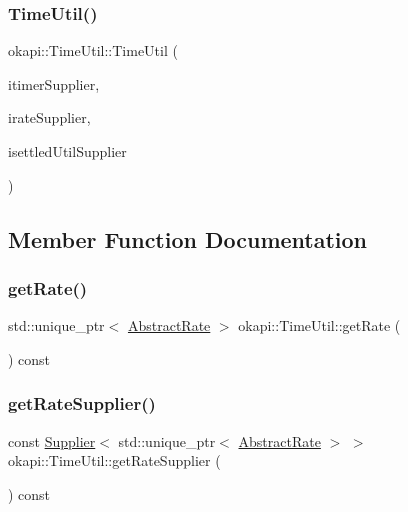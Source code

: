 \subsubsection{\texorpdfstring{TimeUtil()}{TimeUtil()}}
{\footnotesize\ttfamily okapi\+::\+Time\+Util\+::\+Time\+Util (\begin{DoxyParamCaption}\item[{const \mbox{\hyperlink{classokapi_1_1Supplier}{Supplier}}$<$ std\+::unique\+\_\+ptr$<$ \mbox{\hyperlink{classokapi_1_1AbstractTimer}{Abstract\+Timer}} $>$$>$ \&}]{itimer\+Supplier,  }\item[{const \mbox{\hyperlink{classokapi_1_1Supplier}{Supplier}}$<$ std\+::unique\+\_\+ptr$<$ \mbox{\hyperlink{classokapi_1_1AbstractRate}{Abstract\+Rate}} $>$$>$ \&}]{irate\+Supplier,  }\item[{const \mbox{\hyperlink{classokapi_1_1Supplier}{Supplier}}$<$ std\+::unique\+\_\+ptr$<$ \mbox{\hyperlink{classokapi_1_1SettledUtil}{Settled\+Util}} $>$$>$ \&}]{isettled\+Util\+Supplier }\end{DoxyParamCaption})}



\subsection{Member Function Documentation}
\mbox{\label{classokapi_1_1TimeUtil_a71a161d82855bcab94e128106c1646e9}} 
\subsubsection{\texorpdfstring{getRate()}{getRate()}}
{\footnotesize\ttfamily std\+::unique\+\_\+ptr$<$ \mbox{\hyperlink{classokapi_1_1AbstractRate}{Abstract\+Rate}} $>$ okapi\+::\+Time\+Util\+::get\+Rate (\begin{DoxyParamCaption}{ }\end{DoxyParamCaption}) const}

\mbox{\label{classokapi_1_1TimeUtil_a1baebd40208bd1ed9cc07facd6a1ce8e}} 
\subsubsection{\texorpdfstring{getRateSupplier()}{getRateSupplier()}}
{\footnotesize\ttfamily const \mbox{\hyperlink{classokapi_1_1Supplier}{Supplier}}$<$ std\+::unique\+\_\+ptr$<$ \mbox{\hyperlink{classokapi_1_1AbstractRate}{Abstract\+Rate}} $>$ $>$ okapi\+::\+Time\+Util\+::get\+Rate\+Supplier (\begin{DoxyParamCaption}{ }\end{DoxyParamCaption}) const}


